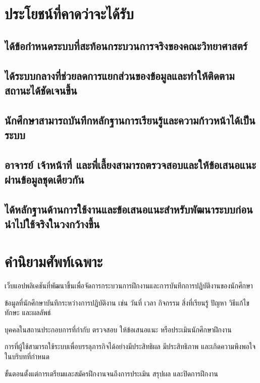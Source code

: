 \documentclass[17pt,a4paper,oneside]{extarticle}
\begin{document}
\section{ประโยชน์ที่คาดว่าจะได้รับ}
\subsection{ได้ข้อกำหนดระบบที่สะท้อนกระบวนการจริงของคณะวิทยาศาสตร์}
\subsection{ได้ระบบกลางที่ช่วยลดการแยกส่วนของข้อมูลและทำให้ติดตามสถานะได้ชัดเจนขึ้น}
\subsection{นักศึกษาสามารถบันทึกหลักฐานการเรียนรู้และความก้าวหน้าได้เป็นระบบ}
\subsection{อาจารย์ เจ้าหน้าที่ และพี่เลี้ยงสามารถตรวจสอบและให้ข้อเสนอแนะผ่านข้อมูลชุดเดียวกัน}
\subsection{ได้หลักฐานด้านการใช้งานและข้อเสนอแนะสำหรับพัฒนาระบบก่อนนำไปใช้จริงในวงกว้างขึ้น}

\section{คำนิยามศัพท์เฉพาะ}
\begin{description}[style=nextline,leftmargin=0.8cm,labelindent=0cm,labelwidth=0cm]
  \item[Trainy] เว็บแอปพลิเคชันที่พัฒนาขึ้นเพื่อจัดการกระบวนการฝึกงานและการบันทึกการปฏิบัติงานของนักศึกษา
  \item[บันทึกการฝึกงาน] ข้อมูลที่นักศึกษาบันทึกระหว่างการปฏิบัติงาน เช่น วันที่ เวลา กิจกรรม สิ่งที่เรียนรู้ ปัญหา วิธีแก้ไข ทักษะ และผลลัพธ์
  \item[ผู้ประกอบการหรือพี่เลี้ยง] บุคคลในสถานประกอบการที่กำกับ ตรวจสอบ ให้ข้อเสนอแนะ หรือประเมินนักศึกษาฝึกงาน
  \item[ความสามารถในการใช้งาน] การที่ผู้ใช้สามารถใช้ระบบเพื่อบรรลุภารกิจได้อย่างมีประสิทธิผล มีประสิทธิภาพ และเกิดความพึงพอใจในบริบทที่กำหนด
  \item[กระบวนการตั้งแต่ต้นจนจบ] ขั้นตอนตั้งแต่การเตรียมและสมัครฝึกงานจนถึงการประเมิน สรุปผล และปิดการฝึกงาน
\end{description}
\end{document}
